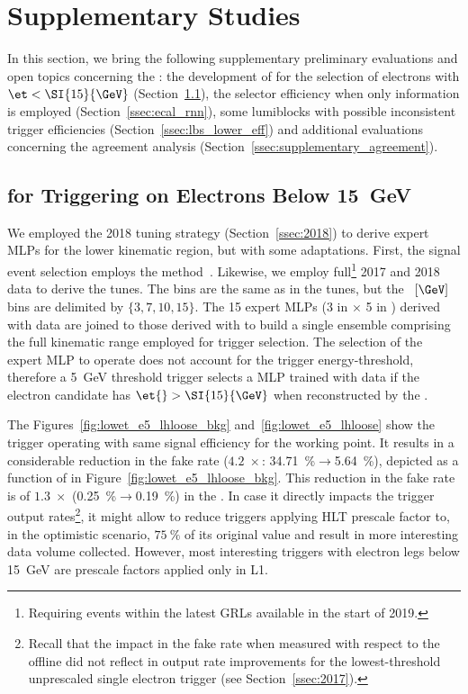 \section{Supplementary Studies}\label{sec:supplementary_studies}

In this section, we bring the following supplementary preliminary evaluations
and open topics concerning the \rnn{}: the development of \rnn{} for the
selection of electrons with $\et<\SI{15}{\GeV}$ (Section~\ref{ssec:low_et}), the
selector efficiency when only \ecal{} information is employed
(Section~\ref{ssec:ecal_rnn}), some lumiblocks with possible inconsistent
trigger efficiencies (Section~\ref{ssec:lbs_lower_eff}) and additional
evaluations concerning the agreement analysis
(Section~\ref{ssec:supplementary_agreement}).

\subsection{\rnn{} for Triggering on Electrons Below \SI{15}{\GeV}}%
\label{ssec:low_et}

We employed the 2018 tuning strategy (Section~\ref{ssec:2018}) to derive
expert MLPs for the lower kinematic region, but with some
adaptations. First, the signal event selection employs the \Jee{} \tnp{}
method~\cite{PERF-2016-01}.  Likewise, we employ full\footnote{Requiring events
within the latest GRLs available in the start of 2019.} 2017 and 2018 data to
derive the tunes. The \abseta{} bins are the same as in the \Zee{} \tnp{} tunes,
but the \et{}~$[\GeV]$ bins are delimited by $\{3,7,10,15\}$. The 15 expert MLPs (3 in
\et{} $\times$ 5 in \eta{}) derived with \Jee{} \tnp{} data are joined to those
derived with \Zee{} \tnp{} to build a single ensemble comprising the full
kinematic range employed for trigger selection. The selection of the expert MLP
to operate does not account for the trigger energy-threshold, therefore a
\SI{5}{\GeV} threshold trigger selects a MLP trained with \Zee{} data if the
electron candidate has $\et{} > \SI{15}{\GeV}$ when reconstructed by the
\fastcalo{}.

The Figures~\ref{fig:lowet_e5_lhloose_bkg} and~\ref{fig:lowet_e5_lhloose} show
the \rnn{} trigger operating with same signal efficiency for the \loose{}
working point. It results in a considerable reduction in the \fastcalo{}
fake rate ($4.2\;\times$: \SI{34.71}{\%}$\rightarrow$\SI{5.64}{\%}), depicted as a function of
\eta{} in Figure~\ref{fig:lowet_e5_lhloose_bkg}. This reduction in the fake rate
is of $1.3\;\times$ (\SI{0.25}{\%}$\rightarrow$\SI{0.19}{\%}) in the \hlt{}. In
case it directly impacts the trigger output rates\footnote{Recall that the
impact in the fake rate when measured with respect to the offline did
not reflect in output rate improvements for the lowest-threshold unprescaled
single electron trigger (see Section~\ref{ssec:2017}).}, it might allow to
reduce triggers applying HLT prescale factor to, in the optimistic scenario,
$\SI{75}{\%}$ of its original value and result in more interesting data volume
collected. However, most interesting triggers with electron legs below
\SI{15}{\GeV} are prescale factors applied only in L1.

